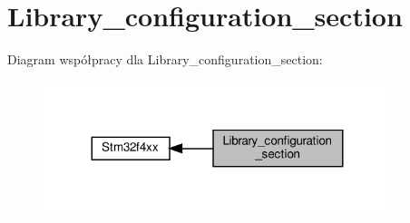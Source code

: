 \hypertarget{group___library__configuration__section}{}\section{Library\+\_\+configuration\+\_\+section}
\label{group___library__configuration__section}
Diagram współpracy dla Library\+\_\+configuration\+\_\+section\+:\nopagebreak
\begin{figure}[H]
\begin{center}
\leavevmode
\includegraphics[width=287pt]{group___library__configuration__section}
\end{center}
\end{figure}
